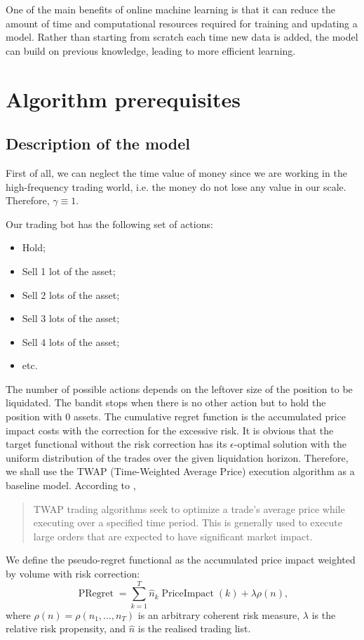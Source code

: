     One of the main benefits of online machine learning is that it can reduce the amount of time and computational resources required for training and updating a model. Rather than starting from scratch each time new data is added, the model can build on previous knowledge, leading to more efficient learning.


\section{Algorithm prerequisites}
    \subsection{Description of the model}
        First of all, we can neglect the time value of money since we are working in the high-frequency
        trading world, i.e. the money do not lose any value in our scale. Therefore, $\gamma \equiv 1$.

        Our trading bot has the following set of actions:
        \begin{itemize}
            \item Hold;
            \item Sell 1 lot of the asset;
            \item Sell 2 lots of the asset;
            \item Sell 3 lots of the asset;
            \item Sell 4 lots of the asset;
            \item etc.
        \end{itemize}
        The number of possible actions depends on the leftover size of the position to be liquidated.
        The bandit stops when there is no other action but to hold the position with 0 assets. 
        The cumulative regret function is the accumulated price impact costs with the correction for the excessive risk.
        It is obvious that the target functional without the risk correction has its $\epsilon$-optimal 
        solution with the uniform distribution of the trades over the given liquidation horizon.
        Therefore, we shall use the TWAP (Time-Weighted Average Price) execution algorithm as a baseline model.
        According to \cite{TWAP}, 
        \begin{quote}
            TWAP trading algorithms seek to optimize a trade's average price while executing over a specified time period. This is generally used to execute large orders that are expected to have significant market impact.
        \end{quote}
        We define the pseudo-regret functional as the accumulated price impact weighted by volume with risk correction:
        \begin{equation}
            \operatorname*{PRegret} = \sum_{k=1}^{T}\hat{n}_k\operatorname*{PriceImpact}(k) + \lambda \rho(n),
        \end{equation}
        where $\rho(n) = \rho(n_1, \dots, n_T)$ is an arbitrary coherent risk measure, $\lambda$ is the relative risk propensity, and $\hat n$ is the realised trading list.

